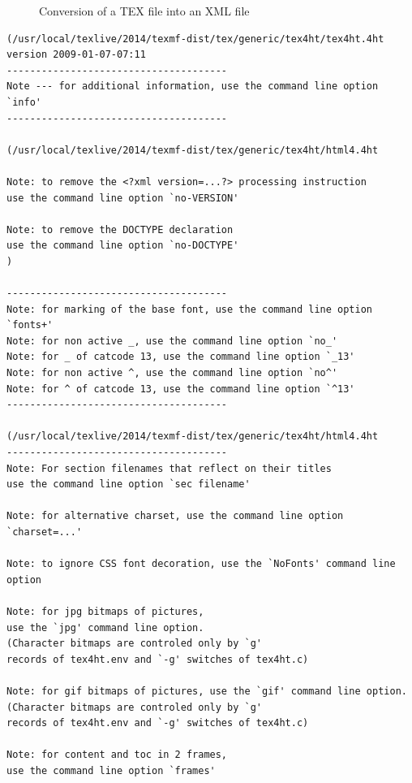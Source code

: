 \raggedbottom{}


\begin{figure}[!htb]
\centering
{}
\caption{\label{fig:tex2xml}Conversion of a TEX file into an XML file}
\end{figure}

\begin{Verbatim}[fontsize=\tiny]
(/usr/local/texlive/2014/texmf-dist/tex/generic/tex4ht/tex4ht.4ht
version 2009-01-07-07:11
--------------------------------------
Note --- for additional information, use the command line option `info'
--------------------------------------

(/usr/local/texlive/2014/texmf-dist/tex/generic/tex4ht/html4.4ht

Note: to remove the <?xml version=...?> processing instruction 
use the command line option `no-VERSION'

Note: to remove the DOCTYPE declaration 
use the command line option `no-DOCTYPE'
)

--------------------------------------
Note: for marking of the base font, use the command line option `fonts+'
Note: for non active _, use the command line option `no_'
Note: for _ of catcode 13, use the command line option `_13'
Note: for non active ^, use the command line option `no^'
Note: for ^ of catcode 13, use the command line option `^13'
--------------------------------------

(/usr/local/texlive/2014/texmf-dist/tex/generic/tex4ht/html4.4ht
--------------------------------------
Note: For section filenames that reflect on their titles 
use the command line option `sec filename'

Note: for alternative charset, use the command line option `charset=...'

Note: to ignore CSS font decoration, use the `NoFonts' command line option

Note: for jpg bitmaps of pictures, 
use the `jpg' command line option. 
(Character bitmaps are controled only by `g' 
records of tex4ht.env and `-g' switches of tex4ht.c) 

Note: for gif bitmaps of pictures, use the `gif' command line option. 
(Character bitmaps are controled only by `g' 
records of tex4ht.env and `-g' switches of tex4ht.c) 

Note: for content and toc in 2 frames, 
use the command line option `frames'


\end{Verbatim}
